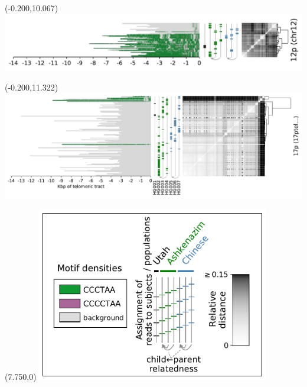\documentclass{article}
\begin{document}
\begin{textblock}{13}(-0.200,10.067)\includegraphics{Figure_4/chr12.pdf}\end{textblock}
\begin{textblock}{13}(-0.200,11.322)\includegraphics{Figure_4/17ptel_1_500K_1_12_12.pdf}\end{textblock}
\begin{textblock}{13}(7.750,0)
\includegraphics[width=4.000in,keepaspectratio]{Figure_4/legend.pdf}
\end{textblock}
\end{document}
